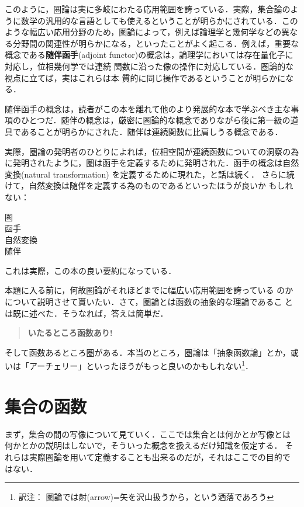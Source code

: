 このように，圏論は実に多岐にわたる応用範囲を誇っている．実際，集合論のよ
うに数学の汎用的な言語としても使えるということが明らかにされている．この
ような幅広い応用分野のため，圏論によって，例えば論理学と幾何学などの異な
る分野間の関連性が明らかになる，といったことがよく起こる．例えば，重要な
概念である{\bfseries 随伴函手}(adjoint
functor)の概念は，論理学においては存在量化子に対応し，位相幾何学では連続
関数に沿った像の操作に対応している．圏論的な視点に立てば，実はこれらは本
質的に同じ操作であるということが明らかになる．

随伴函手の概念は，読者がこの本を離れて他のより発展的な本で学ぶべき主な事
項のひとつだ．随伴の概念は，厳密に圏論的な概念でありながら後に第一級の道
具であることが明らかにされた．随伴は連続関数に比肩しうる概念である．

実際，圏論の発明者のひとりによれば，位相空間が連続函数についての洞察の為
に発明されたように，圏は函手を定義するために発明された．函手の概念は自然
変換(natural transformation)
を定義するために現れた，と話は続く．
さらに続けて，自然変換は随伴を定義する為のものであるといったほうが良いか
もしれない：
\begin{center}
 圏\\
 函手\\
 自然変換\\
 随伴
\end{center}
これは実際，この本の良い要約になっている．

本題に入る前に，何故圏論がそれほどまでに幅広い応用範囲を誇っている
のかについて説明させて貰いたい．さて，圏論とは函数の抽象的な理論であるこ
とは既に述べた．そうなれば，答えは簡単だ．

\begin{quote}
 {\bfseries いたるところ函数あり!}
\end{quote}

そして函数あるところ圏がある．本当のところ，圏論は「抽象函数論」とか，或
いは「アーチェリー」といったほうがもっと良いのかもしれない\footnote{訳注：
圏論では射(arrow)=矢を沢山扱うから，という洒落であろう}．

\section{集合の函数}
\label{sec:functions of sets}
まず，集合の間の写像について見ていく．ここでは集合とは何かとか写像とは
何かとかの説明はしないで，そういった概念を扱えるだけ知識を仮定する．
それらは実際圏論を用いて定義することも出来るのだが，それはここでの目的で
はない．

